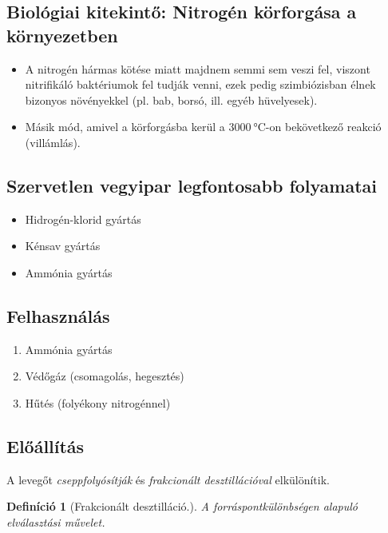 \documentclass{article}
\newtheorem{definition}{Definíció}
\begin{document}
    \subsection{Biológiai kitekintő: Nitrogén körforgása a környezetben}
        \begin{itemize}
            \item A nitrogén hármas kötése miatt majdnem semmi sem veszi fel, viszont nitrifikáló baktériumok fel tudják venni, ezek pedig szimbiózisban élnek bizonyos növényekkel (pl. bab, borsó, ill. egyéb hüvelyesek).
            \item Másik mód, amivel a körforgásba kerül a $\SI{3000}{\degreeCelsius}$-on bekövetkező reakció (villámlás).
        \end{itemize}
    
    \subsection{Szervetlen vegyipar legfontosabb folyamatai}
        \begin{itemize}
            \item Hidrogén-klorid gyártás
            \item Kénsav gyártás
            \item Ammónia gyártás
        \end{itemize}
    
    
    \subsection{Felhasználás}
        \begin{enumerate}
            \item Ammónia gyártás
            \item Védőgáz (csomagolás, hegesztés)
            \item Hűtés (folyékony nitrogénnel)
        \end{enumerate}
        
    \subsection{Előállítás} 
        A levegőt \emph{cseppfolyósítják} és \emph{frakcionált desztillációval} elkülönítik.
        
        \begin{definition}[Frakcionált desztilláció.]
        A forráspontkülönbségen alapuló elválasztási művelet.
        \end{definition}
    
\end{document}
